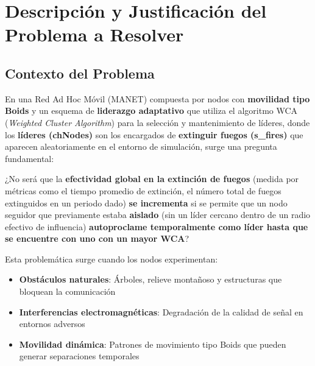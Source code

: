 \documentclass{article}
\begin{document}
\section{Descripción y Justificación del Problema a Resolver}\label{sec:descr}



\subsection{Contexto del Problema}
En una Red Ad Hoc Móvil (MANET) compuesta por nodos con \textbf{movilidad tipo Boids} y un esquema de \textbf{liderazgo adaptativo} que utiliza el algoritmo WCA (\textit{Weighted Cluster Algorithm}) para la selección y mantenimiento de líderes, donde los \textbf{líderes (chNodes)} son los encargados de \textbf{extinguir fuegos (s\_fires)} que aparecen aleatoriamente en el entorno de simulación, surge una pregunta fundamental:

¿No será que la \textbf{efectividad global en la extinción de fuegos} (medida por métricas como el tiempo promedio de extinción, el número total de fuegos extinguidos en un periodo dado) \textbf{se incrementa} si se permite que un nodo seguidor que previamente estaba \textbf{aislado} (sin un líder cercano dentro de un radio efectivo de influencia) \textbf{autoproclame temporalmente como líder hasta que se encuentre con uno con un mayor WCA}?

Esta problemática surge cuando los nodos experimentan:
\begin{itemize}
    \item \textbf{Obstáculos naturales}: Árboles, relieve montañoso y estructuras que bloquean la comunicación
    \item \textbf{Interferencias electromagnéticas}: Degradación de la calidad de señal en entornos adversos
    \item \textbf{Movilidad dinámica}: Patrones de movimiento tipo Boids que pueden generar separaciones temporales
\end{itemize}
\end{document}
